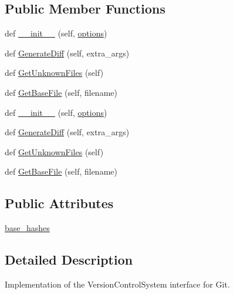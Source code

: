 \subsection*{Public Member Functions}
\begin{DoxyCompactItemize}
\item 
def \hyperlink{classupload_1_1GitVCS_aba4e1dca1c4b3e5db7ba07f6bce3c839}{\+\_\+\+\_\+init\+\_\+\+\_\+} (self, \hyperlink{classupload_1_1VersionControlSystem_a4d57d043bc408887b94269fe4cea9556}{options})
\item 
def \hyperlink{classupload_1_1GitVCS_a3ebfc01cebc9b585706ad3f4389a8833}{Generate\+Diff} (self, extra\+\_\+args)
\item 
def \hyperlink{classupload_1_1GitVCS_ae4e8c0e9fa01619c6a5c76d1ab84b995}{Get\+Unknown\+Files} (self)
\item 
def \hyperlink{classupload_1_1GitVCS_a70ddb65a6b512b8cb8cc4affa37ff9b4}{Get\+Base\+File} (self, filename)
\item 
def \hyperlink{classupload_1_1GitVCS_aba4e1dca1c4b3e5db7ba07f6bce3c839}{\+\_\+\+\_\+init\+\_\+\+\_\+} (self, \hyperlink{classupload_1_1VersionControlSystem_a4d57d043bc408887b94269fe4cea9556}{options})
\item 
def \hyperlink{classupload_1_1GitVCS_a3ebfc01cebc9b585706ad3f4389a8833}{Generate\+Diff} (self, extra\+\_\+args)
\item 
def \hyperlink{classupload_1_1GitVCS_ae4e8c0e9fa01619c6a5c76d1ab84b995}{Get\+Unknown\+Files} (self)
\item 
def \hyperlink{classupload_1_1GitVCS_a70ddb65a6b512b8cb8cc4affa37ff9b4}{Get\+Base\+File} (self, filename)
\end{DoxyCompactItemize}
\subsection*{Public Attributes}
\begin{DoxyCompactItemize}
\item 
\hyperlink{classupload_1_1GitVCS_a07e9469050a157f34fe804cdf6ecddac}{base\+\_\+hashes}
\end{DoxyCompactItemize}


\subsection{Detailed Description}
\begin{DoxyVerb}Implementation of the VersionControlSystem interface for Git.\end{DoxyVerb}
 

